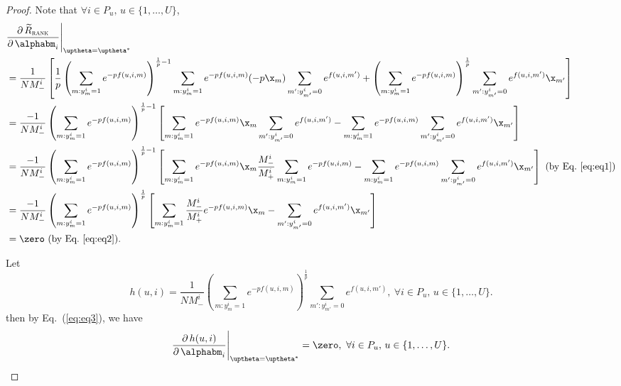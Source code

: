 \begin{proof}
Note that $\forall i \in P_u, \, u \in \{1,\dots,U\}$,
\begin{equation}
\label{eq:eq3}
\begin{aligned}
&\frac{\partial \, \widetilde R_\textsc{rank}} {\partial \, \alphabm_i} \Bigg|_{\uptheta = \uptheta^*} \\
&= \frac{1}{N M_-^i} \left[
   \frac{1}{p} \left( \sum_{m: y_m^i = 1} e^{-p f(u, i, m)} \right)^{\frac{1}{p} - 1} 
   \sum_{m: y_m^i = 1} e^{-p f(u, i, m)} (-p \x_m) 
   \sum_{m': y_{m'}^i = 0} e^{f(u, i, m')} + 
   \left( \sum_{m: y_m^i = 1} e^{-p f(u, i, m)} \right)^\frac{1}{p}
   \sum_{m': y_{m'}^i = 0} e^{f(u, i, m')} \x_{m'} \right] \\
&= \frac{-1}{N M_-^i}
   \left( \sum_{m: y_m^i = 1} e^{-p f(u, i, m)} \right)^{\frac{1}{p} - 1} 
   \left[
   \sum_{m: y_m^i = 1} e^{-p f(u, i, m)} \x_m 
   \sum_{m': y_{m'}^i = 0} e^{f(u, i, m')} -
   \sum_{m: y_m^i = 1} e^{-p f(u, i, m)}
   \sum_{m': y_{m'}^i = 0} e^{f(u, i, m')} \x_{m'} \right] \\
&= \frac{-1}{N M_-^i}
   \left( \sum_{m: y_m^i = 1} e^{-p f(u, i, m)} \right)^{\frac{1}{p} - 1} 
   \left[
   \sum_{m: y_m^i = 1} e^{-p f(u, i, m)} \x_m 
   \frac{M_-^i}{M_+^i} \sum_{m: y_m^i = 1} e^{-p f(u, i, m)} -
   \sum_{m: y_m^i = 1} e^{-p f(u, i, m)}
   \sum_{m': y_{m'}^i = 0} e^{f(u, i, m')} \x_{m'} \right] \ (\text{by Eq.~\ref{eq:eq1}}) \\
&= \frac{-1}{N M_-^i}
   \left( \sum_{m: y_m^i = 1} e^{-p f(u, i, m)} \right)^\frac{1}{p}
   \left[
   \sum_{m: y_m^i = 1} \frac{M_-^i}{M_+^i} e^{-p f(u, i, m)} \x_m -
   \sum_{m': y_{m'}^i = 0} e^{f(u, i, m')} \x_{m'} \right] \\
&= \zero \ (\text{by Eq.~\ref{eq:eq2}}).
\end{aligned}
\end{equation}

Let 
\begin{equation*}
h(u, i) 
= \frac{1}{N M_-^i} \left( \sum_{m: y_m^i = 1} e^{-p f(u, i, m)} \right)^\frac{1}{p} 
  \sum_{m': y_{m'}^i = 0} e^{f(u, i, m')},
\ \forall i \in P_u, \, u \in \{1,\dots,U\}.
\end{equation*}
then by Eq.~(\ref{eq:eq3}), we have
\begin{equation}
\label{eq:eq4}
\frac{\partial \, h(u, i)}{\partial \, \alphabm_i} \Bigg|_{\uptheta = \uptheta^*} = \zero,
\ \forall i \in P_u, \, u \in \{1,\dots,U\}.
\end{equation}


\end{proof}
